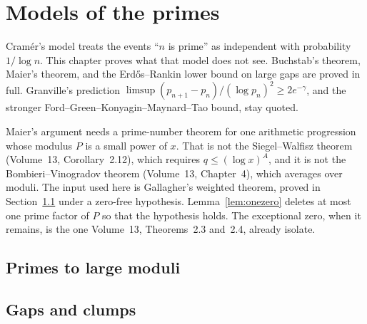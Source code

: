 \chapter{Models of the primes}\label{ch:oc-models}\label{ch:gaps}

Cram\'er's model treats the events ``$n$ is prime'' as independent with probability $1/\log n$. This chapter proves what that model does not see. Buchstab's theorem, Maier's theorem, and the Erd\H{o}s--Rankin lower bound on large gaps are proved in full. Granville's prediction $\limsup(p_{n+1}-p_n)/(\log p_n)^2\ge 2e^{-\gamma}$, and the stronger Ford--Green--Konyagin--Maynard--Tao bound, stay quoted.

Maier's argument needs a prime-number theorem for one arithmetic progression whose modulus $P$ is a small power of $x$. That is not the Siegel--Walfisz theorem (Volume~13, Corollary~2.12), which requires $q\le(\log x)^A$, and it is not the Bombieri--Vinogradov theorem (Volume~13, Chapter~4), which averages over moduli. The input used here is Gallagher's weighted theorem, proved in Section~\ref{ch:largemoduli} under a zero-free hypothesis. Lemma~\ref{lem:onezero} deletes at most one prime factor of $P$ so that the hypothesis holds. The exceptional zero, when it remains, is the one Volume~13, Theorems~2.3 and~2.4, already isolate.

\section{Primes to large moduli}\label{ch:largemoduli}



\section{Gaps and clumps}



